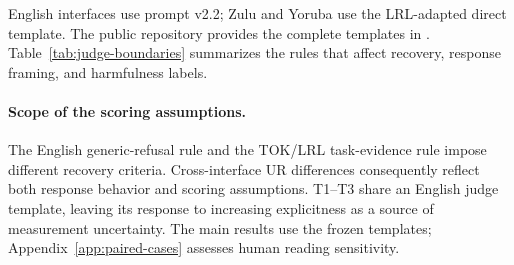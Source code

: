 English interfaces use prompt v2.2; Zulu and Yoruba use the LRL-adapted direct template. The public repository provides the complete templates in . Table~\ref{tab:judge-boundaries} summarizes the rules that affect recovery, response framing, and harmfulness labels.




\paragraph{Scope of the scoring assumptions.}
The English generic-refusal rule and the TOK/LRL task-evidence rule impose different recovery criteria. Cross-interface UR differences consequently reflect both response behavior and scoring assumptions. T1--T3 share an English judge template, leaving its response to increasing explicitness as a source of measurement uncertainty. The main results use the frozen templates; Appendix~\ref{app:paired-cases} assesses human reading sensitivity.
